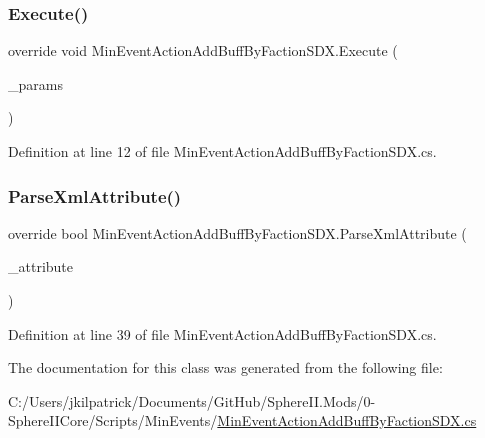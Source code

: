 \subsubsection{\texorpdfstring{Execute()}{Execute()}}
{\footnotesize\ttfamily override void Min\+Event\+Action\+Add\+Buff\+By\+Faction\+S\+D\+X.\+Execute (\begin{DoxyParamCaption}\item[{Min\+Event\+Params}]{\+\_\+params }\end{DoxyParamCaption})}



Definition at line 12 of file Min\+Event\+Action\+Add\+Buff\+By\+Faction\+S\+D\+X.\+cs.

\mbox{\label{class_min_event_action_add_buff_by_faction_s_d_x_af685f41dd43f9385c06a94bb68ce45a0}} 
\subsubsection{\texorpdfstring{ParseXmlAttribute()}{ParseXmlAttribute()}}
{\footnotesize\ttfamily override bool Min\+Event\+Action\+Add\+Buff\+By\+Faction\+S\+D\+X.\+Parse\+Xml\+Attribute (\begin{DoxyParamCaption}\item[{Xml\+Attribute}]{\+\_\+attribute }\end{DoxyParamCaption})}



Definition at line 39 of file Min\+Event\+Action\+Add\+Buff\+By\+Faction\+S\+D\+X.\+cs.



The documentation for this class was generated from the following file\+:\begin{DoxyCompactItemize}
\item 
C\+:/\+Users/jkilpatrick/\+Documents/\+Git\+Hub/\+Sphere\+I\+I.\+Mods/0-\/\+Sphere\+I\+I\+Core/\+Scripts/\+Min\+Events/\mbox{\hyperlink{_min_event_action_add_buff_by_faction_s_d_x_8cs}{Min\+Event\+Action\+Add\+Buff\+By\+Faction\+S\+D\+X.\+cs}}\end{DoxyCompactItemize}
